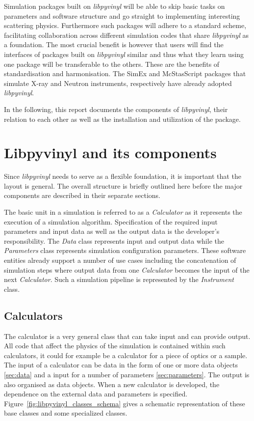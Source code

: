 \documentclass[10pt]{scrartcl}
\begin{document}
Simulation packages built on \textit{libpyvinyl} will be
able to skip basic tasks on parameters and software structure and go straight
to implementing interesting scattering physics. Furthermore such packages
will adhere to a standard scheme, facilitating collaboration across
different simulation codes that share \textit{libpyvinyl} as a foundation.
The most crucial benefit is
however that users will find the interfaces of packages built on
\textit{libpyvinyl} similar and thus what they learn using one package will be
transferable to the others. These are the benefits of standardisation and
harmonisation. The SimEx and McStasScript packages that simulate X-ray and
Neutron instruments, respectively have  already adopted \textit{libpyvinyl}.

In the following, this report documents the components of \textit{libpyvinyl}, their
relation to each other as well as the installation and utilization of the
package.

\section{Libpyvinyl and its components}
\label{sec:libpyvinyl}
Since \textit{libpyvinyl} needs to serve as a flexible foundation, it is
important that the layout is general. The overall structure is briefly outlined
here before the major components are described in their separate sections.

The basic unit in a simulation is referred to as a \textit{Calculator} as it
represents the execution of a simulation algorithm.
Specification of the required input parameters and input data as well as the
output data is the developer's responsibility. The \textit{Data} class
represents input and output data while the \textit{Parameters} class represents
simulation configuration parameters. These software entities already support a
number of use cases including the concatenation of simulation steps where output
data from one \textit{Calculator} becomes the input of the next
\textit{Calculator}.
Such a simulation pipeline is represented by the \textit{Instrument} class.

\subsection{Calculators}
\label{sec:calculators}
The calculator is a very general class that can take input and can provide
output. All code that affect the physics of the simulation is contained within
such calculators, it could for example be a calculator for a piece of optics or
a sample. The input of a calculator can be data in the form of one or more data
objects \ref{sec:data} and a input for a number of parameters
\ref{sec:parameters}. The output is also organised as data objects. When a new
calculator is developed, the dependence on the external data and parameters is
specified. Figure~\ref{fig:libpyvinyl_classes_schema} gives a schematic
representation of these base classes and some specialized classes. 
\end{document}
